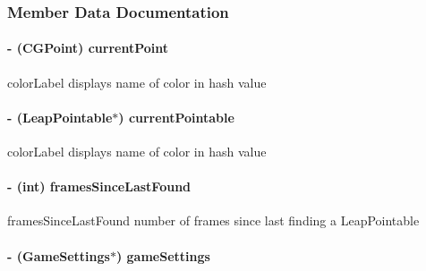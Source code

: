 \subsubsection{Member Data Documentation}
\hypertarget{interface_game_manager_a880d3cc994cc208b57a97fac088c2781}{
\paragraph[{current\-Point}]{\setlength{\rightskip}{0pt plus 5cm}-\/ (C\-G\-Point) current\-Point\hspace{0.3cm}{\ttfamily [protected]}}}\label{d4/d94/interface_game_manager_a880d3cc994cc208b57a97fac088c2781}
color\-Label displays name of color in hash value \hypertarget{interface_game_manager_a9899e94be0e9364a59e5b76d5025d9f7}{
\paragraph[{current\-Pointable}]{\setlength{\rightskip}{0pt plus 5cm}-\/ (Leap\-Pointable$\ast$) current\-Pointable\hspace{0.3cm}{\ttfamily [protected]}}}\label{d4/d94/interface_game_manager_a9899e94be0e9364a59e5b76d5025d9f7}
color\-Label displays name of color in hash value \hypertarget{interface_game_manager_a546c4660d830a79c27bc2a51da00df12}{
\paragraph[{frames\-Since\-Last\-Found}]{\setlength{\rightskip}{0pt plus 5cm}-\/ (int) frames\-Since\-Last\-Found\hspace{0.3cm}{\ttfamily [protected]}}}\label{d4/d94/interface_game_manager_a546c4660d830a79c27bc2a51da00df12}
frames\-Since\-Last\-Found number of frames since last finding a Leap\-Pointable \hypertarget{interface_game_manager_a97ff3b8cd0cbc6baf6f5abe3bb3417ca}{
\paragraph[{game\-Settings}]{\setlength{\rightskip}{0pt plus 5cm}-\/ ({\bf Game\-Settings}$\ast$) game\-Settings\hspace{0.3cm}{\ttfamily [protected]}}}\label{d4/d94/interface_game_manager_a97ff3b8cd0cbc6baf6f5abe3bb3417ca}
